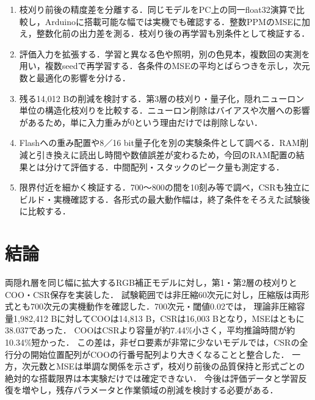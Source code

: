 \documentclass[a4paper,11pt]{article}
\begin{document}
\begin{enumerate}[leftmargin=*,itemsep=4pt]
\item 枝刈り前後の精度差を分離する．同じモデルをPC上の同一float32演算で比較し，Arduinoに搭載可能な幅では実機でも確認する．整数PPMのMSEに加え，整数化前の出力差を測る．枝刈り後の再学習も別条件として検証する．
\item 評価入力を拡張する．学習と異なる色や照明，別の色見本，複数回の実測を用い，複数seedで再学習する．各条件のMSEの平均とばらつきを示し，次元数と最適化の影響を分ける．
\item 残る14,012 Bの削減を検討する．第3層の枝刈り・量子化，隠れニューロン単位の構造化枝刈りを比較する．ニューロン削除はバイアスや次層への影響があるため，単に入力重みが0という理由だけでは削除しない．
\item Flashへの重み配置や8／16 bit量子化を別の実験条件として調べる．RAM削減と引き換えに読出し時間や数値誤差が変わるため，今回のRAM配置の結果とは分けて評価する．中間配列・スタックのピーク量も測定する．
\item 限界付近を細かく検証する．700〜800の間を10刻み等で調べ，CSRも独立にビルド・実機確認する．各形式の最大動作幅は，終了条件をそろえた試験後に比較する．
\end{enumerate}

\section{結論}

両隠れ層を同じ幅に拡大するRGB補正モデルに対し，第1・第2層の枝刈りとCOO・CSR保存を実装した．
試験範囲では非圧縮60次元に対し，圧縮版は両形式とも700次元の実機動作を確認した．700次元・閾値0.02では，
理論非圧縮容量1,982,412 Bに対してCOOは14,813 B，CSRは16,003 Bとなり，MSEはともに38.037であった．
COOはCSRより容量が約7.44\%小さく，平均推論時間が約10.34\%短かった．
この差は，非ゼロ要素が非常に少ないモデルでは，CSRの全行分の開始位置配列がCOOの行番号配列より大きくなることと整合した．
一方，次元数とMSEは単調な関係を示さず，枝刈り前後の品質保持と形式ごとの絶対的な搭載限界は本実験だけでは確定できない．
今後は評価データと学習反復を増やし，残存パラメータと作業領域の削減を検討する必要がある．
\end{document}
